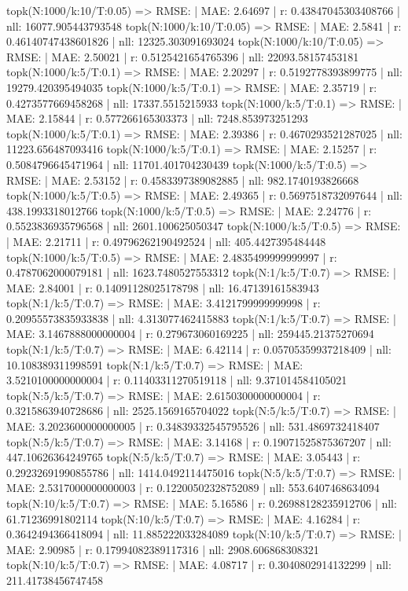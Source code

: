 topk(N:1000/k:10/T:0.05) => RMSE: | MAE: 2.64697 | r: 0.43847045303408766 | nll: 16077.905443793548
topk(N:1000/k:10/T:0.05) => RMSE: | MAE: 2.5841 | r: 0.46140747438601826 | nll: 12325.303091693024
topk(N:1000/k:10/T:0.05) => RMSE: | MAE: 2.50021 | r: 0.5125421654765396 | nll: 22093.58157453181
topk(N:1000/k:5/T:0.1) => RMSE: | MAE: 2.20297 | r: 0.5192778393899775 | nll: 19279.420395494035
topk(N:1000/k:5/T:0.1) => RMSE: | MAE: 2.35719 | r: 0.4273577669458268 | nll: 17337.5515215933
topk(N:1000/k:5/T:0.1) => RMSE: | MAE: 2.15844 | r: 0.577266165303373 | nll: 7248.853973251293
topk(N:1000/k:5/T:0.1) => RMSE: | MAE: 2.39386 | r: 0.4670293521287025 | nll: 11223.656487093416
topk(N:1000/k:5/T:0.1) => RMSE: | MAE: 2.15257 | r: 0.5084796645471964 | nll: 11701.401704230439
topk(N:1000/k:5/T:0.5) => RMSE: | MAE: 2.53152 | r: 0.4583397389082885 | nll: 982.1740193826668
topk(N:1000/k:5/T:0.5) => RMSE: | MAE: 2.49365 | r: 0.5697518732097644 | nll: 438.1993318012766
topk(N:1000/k:5/T:0.5) => RMSE: | MAE: 2.24776 | r: 0.5523836935796568 | nll: 2601.100625050347
topk(N:1000/k:5/T:0.5) => RMSE: | MAE: 2.21711 | r: 0.49796262190492524 | nll: 405.4427395484448
topk(N:1000/k:5/T:0.5) => RMSE: | MAE: 2.4835499999999997 | r: 0.4787062000079181 | nll: 1623.7480527553312
topk(N:1/k:5/T:0.7) => RMSE: | MAE: 2.84001 | r: 0.14091128025178798 | nll: 16.47139161583943
topk(N:1/k:5/T:0.7) => RMSE: | MAE: 3.4121799999999998 | r: 0.20955573835933838 | nll: 4.313077462415883
topk(N:1/k:5/T:0.7) => RMSE: | MAE: 3.1467888000000004 | r: 0.279673060169225 | nll: 259445.21375270694
topk(N:1/k:5/T:0.7) => RMSE: | MAE: 6.42114 | r: 0.05705359937218409 | nll: 10.108389311998591
topk(N:1/k:5/T:0.7) => RMSE: | MAE: 3.5210100000000004 | r: 0.11403311270519118 | nll: 9.371014584105021
topk(N:5/k:5/T:0.7) => RMSE: | MAE: 2.6150300000000004 | r: 0.3215863940728686 | nll: 2525.1569165704022
topk(N:5/k:5/T:0.7) => RMSE: | MAE: 3.2023600000000005 | r: 0.34839332545795526 | nll: 531.4869732418407
topk(N:5/k:5/T:0.7) => RMSE: | MAE: 3.14168 | r: 0.19071525875367207 | nll: 447.10626364249765
topk(N:5/k:5/T:0.7) => RMSE: | MAE: 3.05443 | r: 0.29232691990855786 | nll: 1414.0492114475016
topk(N:5/k:5/T:0.7) => RMSE: | MAE: 2.5317000000000003 | r: 0.12200502328752089 | nll: 553.6407468634094
topk(N:10/k:5/T:0.7) => RMSE: | MAE: 5.16586 | r: 0.26988128235912706 | nll: 61.71236991802114
topk(N:10/k:5/T:0.7) => RMSE: | MAE: 4.16284 | r: 0.3642494366418094 | nll: 11.885222033284089
topk(N:10/k:5/T:0.7) => RMSE: | MAE: 2.90985 | r: 0.17994082389117316 | nll: 2908.606868308321
topk(N:10/k:5/T:0.7) => RMSE: | MAE: 4.08717 | r: 0.3040802914132299 | nll: 211.41738456747458
